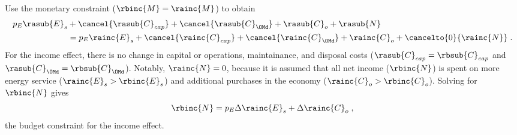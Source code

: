 \begin{landscape}
{Use the monetary constraint ($\rbinc{M} = \rainc{M}$) to obtain
%
\begin{align}
  p_E \rasub{E}_s &+ \cancel{\rasub{C}_{cap}} + \cancel{\rasub{C}_{\OMd}} + \rasub{C}_o + \rasub{N} \nonumber \\
                  &= p_E \rainc{E}_s + \cancel{\rainc{C}_{cap}} + \cancel{\rainc{C}_{\OMd}} + \rainc{C}_o + \cancelto{0}{\rainc{N}} \; .
\end{align}
%
For the income effect, there is no change in capital or operations, maintainance, and disposal costs
($\rasub{C}_{cap} = \rbsub{C}_{cap}$ and $\rasub{C}_{\OMd} = \rbsub{C}_{\OMd}$).
Notably, $\rainc{N} = 0$,
because it is assumed that all net income ($\rbinc{N}$) is spent on
more energy service ($\rainc{E}_s > \rbinc{E}_s$)
and
additional purchases in the economy ($\rainc{C}_o > \rbinc{C}_o$).
Solving for $\rbinc{N}$ gives 
%
\begin{equation} \label{eq:inc_budget_constraint}
  \rbinc{N} = p_E \Delta \rainc{E}_s + \Delta \rainc{C}_o \; ,
\end{equation}
%
the budget constraint for the income effect.
}
\end{landscape}
